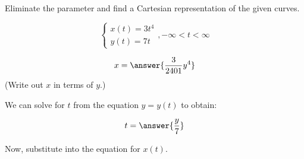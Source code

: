 \documentclass{ximera}
\author{Jim Talamo and Nick Hemleben}
\begin{document}
\begin{exercise}
Eliminate the parameter and find a Cartesian representation of the given curves.

\[
 \begin{cases}
x(t)=  3t^4\\
y(t)=  7 t
\end{cases} 
, -\infty < t < \infty
\]

\[
x= \answer{ \frac {3}{2401} y^4 }
\]
(Write out $x$ in terms of $y$.)
\begin{hint}
We can solve for $t$ from the equation $y=y(t)$ to obtain:

\[ t = \answer{\frac{y}{7}}\]

Now, substitute into the equation for $x(t)$.

\end{hint}
\end{exercise}
\end{document}
